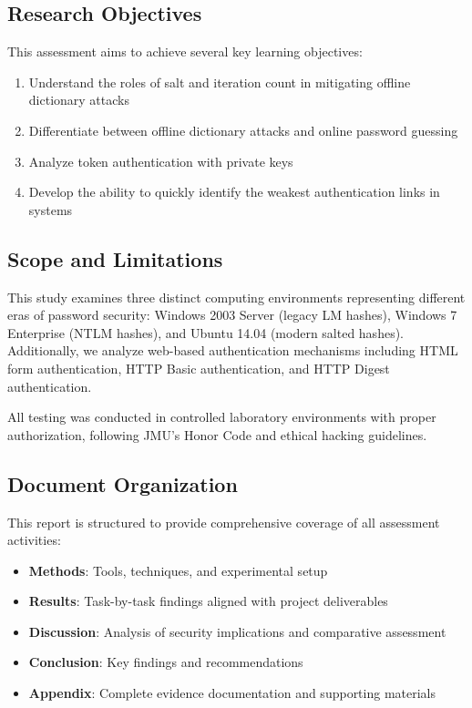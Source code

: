 \subsection{Research Objectives}

This assessment aims to achieve several key learning objectives:

\begin{enumerate}
    \item Understand the roles of salt and iteration count in mitigating offline dictionary attacks
    \item Differentiate between offline dictionary attacks and online password guessing
    \item Analyze token authentication with private keys
    \item Develop the ability to quickly identify the weakest authentication links in systems
\end{enumerate}

\subsection{Scope and Limitations}

This study examines three distinct computing environments representing different eras of password security: Windows 2003 Server (legacy LM hashes), Windows 7 Enterprise (NTLM hashes), and Ubuntu 14.04 (modern salted hashes). Additionally, we analyze web-based authentication mechanisms including HTML form authentication, HTTP Basic authentication, and HTTP Digest authentication.

All testing was conducted in controlled laboratory environments with proper authorization, following JMU's Honor Code and ethical hacking guidelines.

\subsection{Document Organization}

This report is structured to provide comprehensive coverage of all assessment activities:
\begin{itemize}
    \item \textbf{Methods}: Tools, techniques, and experimental setup
    \item \textbf{Results}: Task-by-task findings aligned with project deliverables
    \item \textbf{Discussion}: Analysis of security implications and comparative assessment
    \item \textbf{Conclusion}: Key findings and recommendations
    \item \textbf{Appendix}: Complete evidence documentation and supporting materials
\end{itemize}